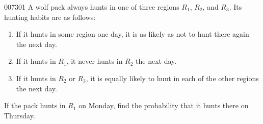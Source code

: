 \begin{example}{}{007301}
A wolf pack always hunts in one of three regions $R_{1}$, $R_{2}$, and $R_{3}$. Its hunting habits are as follows:


\begin{enumerate}
\item If it hunts in some region one day, it is as likely as not to hunt there again the next day.

\item If it hunts in $R_{1}$, it never hunts in $R_{2}$ the next day.

\item If it hunts in $R_{2}$ or $R_{3}$, it is equally likely to hunt in each of the other regions the next day.

\end{enumerate}

If the pack hunts in $R_{1}$ on Monday, find the probability that it hunts there on Thursday.



\end{example}
